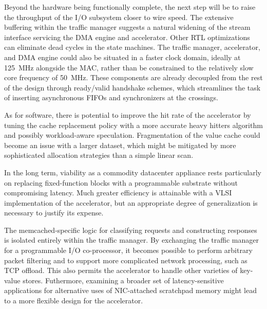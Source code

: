 
Beyond the hardware being functionally complete, the next step will be
to raise the throughput of the I/O subsystem closer to wire speed.
The extensive buffering within the traffic manager suggests a natural
widening of the stream interface servicing the DMA engine and
accelerator.
Other RTL optimizations can eliminate dead cycles in the state machines.
The traffic manager, accelerator, and DMA engine could also be situated
in a faster clock domain, ideally at \SI{125}{\mega\hertz} alongside the
MAC, rather than be constrained to the relatively slow core
frequency of \SI{50}{\mega\hertz}.
These components are already decoupled from the rest of the design
through ready/valid handshake schemes, which streamlines the task of
inserting asynchronous FIFOs and synchronizers at the crossings.

As for software, there is potential to improve the hit rate of the
accelerator by tuning the cache replacement policy with a more accurate
heavy hitters algorithm and possibly workload-aware speculation.
Fragmentation of the value cache could become an issue with a larger
dataset, which might be mitigated by more sophisticated allocation
strategies than a simple linear scan.

In the long term, viability as a commodity datacenter appliance rests
particularly on replacing fixed-function blocks with a programmable
substrate without compromising latency.
Much greater efficiency is attainable with a VLSI implementation of the
accelerator, but an appropriate degree of generalization is necessary to
justify its expense.

The memcached-specific logic for classifying requests and constructing
responses is isolated entirely within the traffic manager.
By exchanging the traffic manager for a programmable I/O co-processor,
it becomes possible to perform arbitrary packet filtering and to
support more complicated network processing, such as TCP offload.
This also permits the accelerator to handle other varieties of key-value
stores.
Futhermore, examining a broader set of latency-sensitive applications
for alternative uses of NIC-attached scratchpad memory might lead to a
more flexible design for the accelerator.

